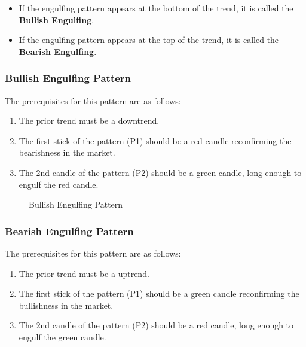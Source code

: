 \begin{itemize}
  \item If the engulfing pattern appears at the bottom of the trend, it is called the \textbf{Bullish Engulfing}.
  \item If the engulfing pattern appears at the top of the trend, it is called the \textbf{Bearish Engulfing}.
\end{itemize}

\subsubsection{Bullish Engulfing Pattern}

The prerequisites for this pattern are as follows:
\begin{enumerate}
  \item The prior trend must be a downtrend.
  \item The first stick of the pattern (P1) should be a red candle reconfirming the bearishness in the market.
  \item The 2nd candle of the pattern (P2) should be a green candle, long enough to engulf the red candle.
\end{enumerate}

\begin{figure}[h]
  \centering

  \caption{Bullish Engulfing Pattern}
\end{figure}

\newpage

\subsubsection{Bearish Engulfing Pattern}

The prerequisites for this pattern are as follows:
\begin{enumerate}
  \item The prior trend must be a uptrend.
  \item The first stick of the pattern (P1) should be a green candle reconfirming the bullishness in the market.
  \item The 2nd candle of the pattern (P2) should be a red candle, long enough to engulf the green candle.
\end{enumerate}

